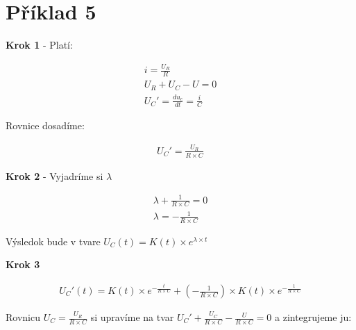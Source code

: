 \section{Příklad 5}

\begin{center}
\textbf{Krok 1} - Platí:
\end{center}

\begin{gather*}
i = \frac{U_{R}}{R}\\
U_{R} + U_{C} - U = 0\\
U_{C}' = \frac{du_{c}}{dt}=\frac{i}{C}
\end{gather*}

\begin{center}
Rovnice dosadíme:
\end{center}

\begin{gather*}
U_{C}' = \frac{U_{R}}{R \times C}
\end{gather*}

\begin{center}
\textbf{Krok 2} - Vyjadríme si $\lambda $
\end{center}

\begin{gather*}
\lambda + \frac{1}{R \times C} = 0\\
\lambda = -\frac{1}{R \times C}
\end{gather*}

\begin{center}
Výsledok bude v tvare $U_{C}(t) = K(t) \times e^{\lambda \times t}$
\end{center}

\newpage

\begin{center}
\textbf{Krok 3}
\end{center}

\begin{gather*}
U_{C}'(t) = K(t) \times e^{-\frac{t}{R \times C}} + (-\frac{1}{R \times C}) \times K(t) \times e^{-\frac{1}{R \times C}}
\end{gather*}

\begin{center}
Rovnicu $U_{C} = \frac{U_{R}}{R \times C}$ si upravíme na tvar $U_{C}' + \frac{U_{C}}{R \times C} -  \frac{U}{R \times C} = 0$ a zintegrujeme ju:
\end{center}

